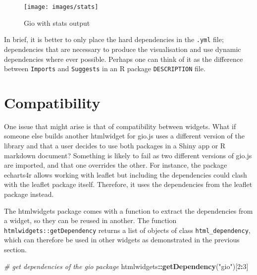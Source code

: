 \documentclass[10pt,]{krantz}
\makeatletter
\newenvironment{Shaded}{\begin{snugshade}}{\end{snugshade}}
\newcommand{\CommentTok}[1]{\textcolor[rgb]{0.37,0.37,0.37}{\textit{#1}}}
\newcommand{\DecValTok}[1]{\textcolor[rgb]{0.06,0.06,0.06}{#1}}
\newcommand{\KeywordTok}[1]{\textcolor[rgb]{0.27,0.27,0.27}{\textbf{#1}}}
\newcommand{\NormalTok}[1]{#1}
\newcommand{\OperatorTok}[1]{\textcolor[rgb]{0.43,0.43,0.43}{\textbf{#1}}}
\newcommand{\StringTok}[1]{\textcolor[rgb]{0.5,0.5,0.5}{#1}}
\newenvironment{kframe}{%
\medskip{}
\setlength{\fboxsep}{.8em}
 \def\at@end@of@kframe{}%
 \ifinner\ifhmode%
  \def\at@end@of@kframe{\end{minipage}}%
  \begin{minipage}{\columnwidth}%
 \fi\fi%
 \def\FrameCommand##1{\hskip\@totalleftmargin \hskip-\fboxsep
 \colorbox{shadecolor}{##1}\hskip-\fboxsep
     \hskip-\linewidth \hskip-\@totalleftmargin \hskip\columnwidth}%
 \MakeFramed {\advance\hsize-\width
   \@totalleftmargin\z@ \linewidth\hsize
   \@setminipage}}%
 {\par\unskip\endMakeFramed%
 \at@end@of@kframe}
\renewenvironment{Shaded}{\begin{kframe}}{\end{kframe}}
\makeatother
\begin{document}
\begin{Shaded}
\end{Shaded}

\begin{figure}[H]

{\centering \texttt{[image: images/stats]} 

}

\caption{Gio with stats output}\label{fig:gio-stats}
\end{figure}

In brief, it is better to only place the hard dependencies in the \texttt{.yml} file; dependencies that are necessary to produce the visualisation and use dynamic dependencies where ever possible. Perhaps one can think of it as the difference between \texttt{Imports} and \texttt{Suggests} in an R package \texttt{DESCRIPTION} file.

\hypertarget{widgets-adv-compatibility}{%
\section{Compatibility}\label{widgets-adv-compatibility}}

One issue that might arise is that of compatibility between widgets. What if someone else builds another htmlwidget for gio.js uses a different version of the library and that a user decides to use both packages in a Shiny app or R markdown document? Something is likely to fail as two different versions of gio.js are imported, and that one overrides the other. For instance, the package echarts4r \citep{R-echarts4r} allows working with leaflet but including the dependencies could clash with the leaflet package itself. Therefore, it uses the dependencies from the leaflet package instead.

The htmlwidgets package comes with a function to extract the dependencies from a widget, so they can be reused in another. The function \texttt{htmlwidgets::getDependency} returns a list of objects of class \texttt{html\_dependency}, which can therefore be used in other widgets as demonstrated in the previous section.

\begin{Shaded}
\begin{Highlighting}[]
\CommentTok{# get dependencies of the gio package}
\NormalTok{htmlwidgets}\OperatorTok{::}\KeywordTok{getDependency}\NormalTok{(}\StringTok{"gio"}\NormalTok{)[}\DecValTok{2}\OperatorTok{:}\DecValTok{3}\NormalTok{]}
\end{Highlighting}
\end{Shaded}
\end{document}
